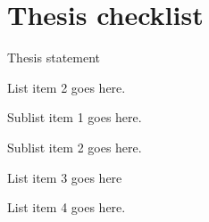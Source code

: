\newpage 
\section*{Thesis checklist}
  \begin{todolist}
    \item Thesis statement
    \item List item 2 goes here.
    \begin{todolist}
      \item Sublist item 1 goes here.
      \item Sublist item 2 goes here.
    \end{todolist}
    \item List item 3 goes here
    \item List item 4 goes here.
  \end{todolist}
